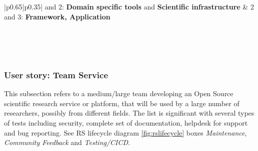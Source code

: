 \begin{center}
    \tabletail{\hline}
    \label{tab:rs_recc07}
    \small
    \begin{supertabular}{|p{0.65\linewidth}|p{0.35\linewidth}|}  and 2: \textbf{Domain specific tools} and  \textbf{Scientific infrastructure} &
    2 and 3: \textbf{Framework, Application} \\ \hline \hline

     \\ \hline
     \\ \hline
     \\ \hline

\end{supertabular}
\end{center}

\subsubsection{User story: Team Service}

This subsection refers to a medium/large team developing an Open Source scientific research service or platform, that will be used by a large number of researchers, possibly from different fields. The list is significant with several types of tests including security, complete set of documentation, helpdesk for support and bug reporting. See RS lifecycle diagram \ref{fig:rslifecycle} boxes \textit{Maintenance}, \textit{Community Feedback} and \textit{Testing/CICD}.

